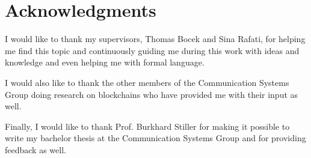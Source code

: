 \chapter*{Acknowledgments}

I would like to thank my supervisors, Thomas Bocek and Sina Rafati, for helping me find this topic and continuously guiding me during this work with ideas and knowledge and even helping me with formal language.

I would also like to thank the other members of the Communication Systems Group doing research on blockchains who have provided me with their input as well.

Finally, I would like to thank Prof. Burkhard Stiller for making it possible to write my bachelor thesis at the Communication Systems Group and for providing feedback as well.
